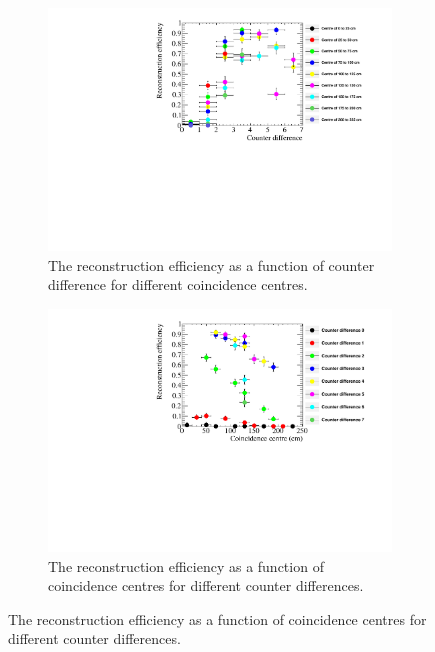 \begin{figure}[h!]
  \centering
  \begin{subfigure}{0.65\textwidth}
    \centering
    \includegraphics[width=\textwidth]{AngleCanvas_50}
    \caption{The reconstruction efficiency as a function of counter difference for different coincidence centres.}
    \label{fig:AngleCanvas}
  \end{subfigure}
  \begin{subfigure}{0.65\textwidth}
    \centering
    \includegraphics[width=\textwidth]{DistanceCanvas_50}
    \caption{The reconstruction efficiency as a function of coincidence centres for different counter differences.}
    \label{fig:DistanceCanvas}
  \end{subfigure}


\end{figure}
